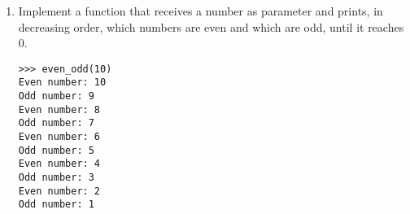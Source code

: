 \begin{enumerate}

\item Implement a function that receives a number as parameter and prints, in decreasing order, which numbers are even and which are odd, until it reaches 0.

\begin{lstlisting}
>>> even_odd(10)
Even number: 10
Odd number: 9
Even number: 8
Odd number: 7
Even number: 6
Odd number: 5
Even number: 4
Odd number: 3
Even number: 2
Odd number: 1
\end{lstlisting}

\end{enumerate}